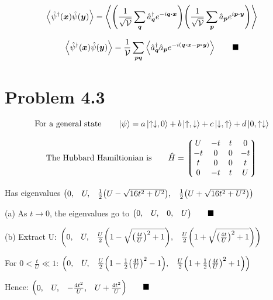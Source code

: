 \documentclass{amsart}
\begin{document}
\[ \expval{\hat{\psi}^\dagger(\boldsymbol{x})\hat{\psi}(\boldsymbol{y})}=
\expval{\qty(\frac{1}{\sqrt{\mathcal{V}}} \sum_{\boldsymbol{q}} \hat{a}^{\dagger}_{\boldsymbol{q}}e^{-i\boldsymbol{q}\vdot\boldsymbol{x}})\qty(\frac{1}{\sqrt{\mathcal{V}}} \sum_{\boldsymbol{p}} \hat{a}_{\boldsymbol{p}}e^{i\boldsymbol{p}\vdot\boldsymbol{y}} )} \]

\[ \expval{\hat{\psi}^\dagger(\boldsymbol{x})\hat{\psi}(\boldsymbol{y})}=
\frac{1}{\mathcal{V}}\sum_{\boldsymbol{pq}} \expval{ \hat{a}^{\dagger}_{\boldsymbol{q}}\hat{a}_{\boldsymbol{p}}e^{-i(\boldsymbol{q}\vdot\boldsymbol{x}-\boldsymbol{p}\vdot\boldsymbol{y})}} \qquad\blacksquare\]


\section*{Problem 4.3}

\[\text{For a general state}\qquad \ket{\psi}=a\ket{\uparrow\downarrow,0}+b\ket{\uparrow,\downarrow}+c\ket{\downarrow,\uparrow}+d\ket{0,\uparrow\downarrow} \]

\[\text{The Hubbard Hamiltionian is}\qquad \hat{H}=\mqty*(U&-t&t&0 \\-t&0&0&-t \\t&0&0&t \\0&-t&t&U) \]

Has eigenvalues $ \mqty(0,&U,&\frac{1}{2}\qty(U-\sqrt{16t^2+U^2}),&\frac{1}{2}\qty(U+\sqrt{16t^2+U^2})) $

(a) As $t\rightarrow0$, the eigenvalues go to $ \mqty(0,&U,&0,&U) \qquad\blacksquare$

(b) Extract U: $ \mqty(0,&U,&\frac{U}{2}\qty(1-\sqrt{\qty(\frac{4t}{U})^2+1}),&\frac{U}{2}\qty(1+\sqrt{\qty(\frac{4t}{U})^2+1})) $

For $0<\frac{t}{U}\ll 1$:  $ \mqty(0,&U,&\frac{U}{2}\qty(1-\frac{1}{2}\qty(\frac{4t}{U})^2-1),&\frac{U}{2}\qty(1+\frac{1}{2}\qty(\frac{4t}{U})^2+1)) $

Hence: $ \mqty(0,&U,&-\frac{4t^2}{U},&U+\frac{4t^2}{U}) \qquad\blacksquare$
\end{document}
